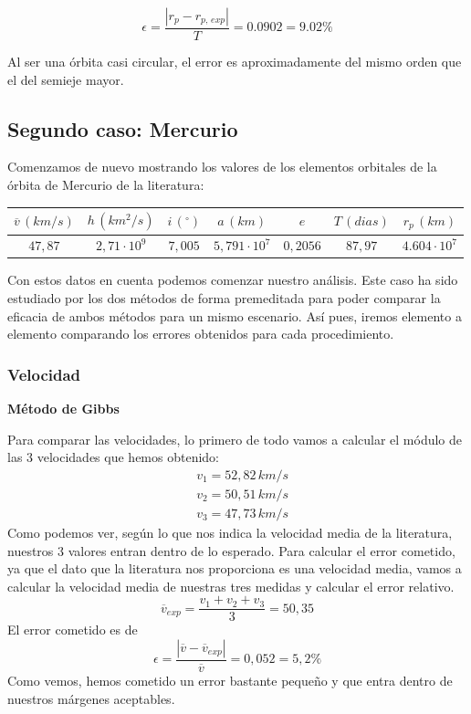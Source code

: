 \documentclass{article}
\numberwithin{equation}{section}
\begin{document}
\begin{equation*}
    \epsilon=\frac{\left\lvert r_p-r_{p,\,exp} \right\rvert}{T}=0.0902=9.02\%
\end{equation*}

Al ser una órbita casi circular, el error es aproximadamente del mismo orden que el del semieje mayor.

\subsection{Segundo caso: Mercurio}
Comenzamos de nuevo mostrando los valores de los elementos orbitales 
de la órbita de Mercurio de la literatura: 

\begin{center}
    \centering
    \begin{tabular}{|c|c|c|c|c|c|c|}
    \hline
    $\overline{v}\, (km/s)$ & $h\, (km^{2}/s)$ & $i\, (^{\circ})$ & $a\, (km)$ & $e$ & $T\, (dias)$ & $r_{p}\, (km)$\\ \hline
    $47,87$ & $2,71 \cdot 10^{9}$ & $7,005$ & $5,791\cdot 10^{7}$ & $0,2056$ & $87,97$ & $4.604\cdot10^7$\\ \hline
    \end{tabular}
\end{center}

Con estos datos en cuenta podemos comenzar nuestro análisis. Este caso ha sido estudiado por los dos métodos de forma premeditada para poder comparar la eficacia de ambos métodos para un mismo escenario. Así pues, iremos elemento a elemento comparando los errores obtenidos para cada procedimiento.

\subsubsection{Velocidad}
\noindent\textbf{Método de Gibbs}\par
Para comparar las velocidades, lo primero de todo vamos a 
calcular el módulo de las 3 velocidades que hemos obtenido: 
\begin{align*}
    &v_{1}=52,82\, km/s \\
    &v_{2}=50,51\, km/s  \\
    &v_{3}=47,73\, km/s 
\end{align*}
Como podemos ver, según lo que nos indica la velocidad media 
de la literatura, nuestros 3 valores entran dentro de lo esperado. 
Para calcular el error cometido, ya que el dato que la literatura 
nos proporciona es una velocidad media, vamos a calcular la 
velocidad media de nuestras tres medidas y calcular el error 
relativo. 
\begin{equation*}
    \overline{v}_{exp}=\frac{v_{1}+v_{2}+v_{3}}{3}=50,35  
\end{equation*}
El error cometido es de 
\begin{equation*}
    \epsilon=\frac{\left\lvert \overline{v}-\overline{v}_{exp} \right\rvert }{\overline{v}}=0,052=5,2\%
\end{equation*}
Como vemos, hemos cometido un error bastante pequeño y que entra 
dentro de nuestros márgenes aceptables.\\
\end{document}
